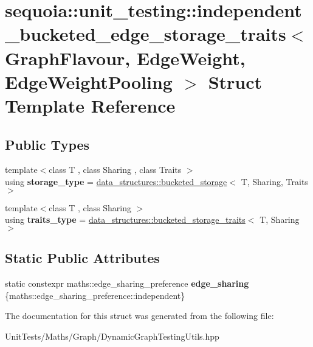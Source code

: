 \hypertarget{structsequoia_1_1unit__testing_1_1independent__bucketed__edge__storage__traits}{}\section{sequoia\+::unit\+\_\+testing\+::independent\+\_\+bucketed\+\_\+edge\+\_\+storage\+\_\+traits$<$ Graph\+Flavour, Edge\+Weight, Edge\+Weight\+Pooling $>$ Struct Template Reference}
\label{structsequoia_1_1unit__testing_1_1independent__bucketed__edge__storage__traits}
\subsection*{Public Types}
\begin{DoxyCompactItemize}
\item 
\mbox{\label{structsequoia_1_1unit__testing_1_1independent__bucketed__edge__storage__traits_a3c6ffd488fc41ea60349c90641c78076}} 
{\footnotesize template$<$class T , class Sharing , class Traits $>$ }\\using {\bfseries storage\+\_\+type} = \mbox{\hyperlink{classsequoia_1_1data__structures_1_1bucketed__storage}{data\+\_\+structures\+::bucketed\+\_\+storage}}$<$ T, Sharing, Traits $>$
\item 
\mbox{\label{structsequoia_1_1unit__testing_1_1independent__bucketed__edge__storage__traits_a6b73b9b7e9431560b1768e075cf7d6ab}} 
{\footnotesize template$<$class T , class Sharing $>$ }\\using {\bfseries traits\+\_\+type} = \mbox{\hyperlink{structsequoia_1_1data__structures_1_1bucketed__storage__traits}{data\+\_\+structures\+::bucketed\+\_\+storage\+\_\+traits}}$<$ T, Sharing $>$
\end{DoxyCompactItemize}
\subsection*{Static Public Attributes}
\begin{DoxyCompactItemize}
\item 
\mbox{\label{structsequoia_1_1unit__testing_1_1independent__bucketed__edge__storage__traits_a995082617e36954bac236ae0a87402ff}} 
static constexpr maths\+::edge\+\_\+sharing\+\_\+preference {\bfseries edge\+\_\+sharing} \{maths\+::edge\+\_\+sharing\+\_\+preference\+::independent\}
\end{DoxyCompactItemize}


The documentation for this struct was generated from the following file\+:\begin{DoxyCompactItemize}
\item 
Unit\+Tests/\+Maths/\+Graph/Dynamic\+Graph\+Testing\+Utils.\+hpp\end{DoxyCompactItemize}
